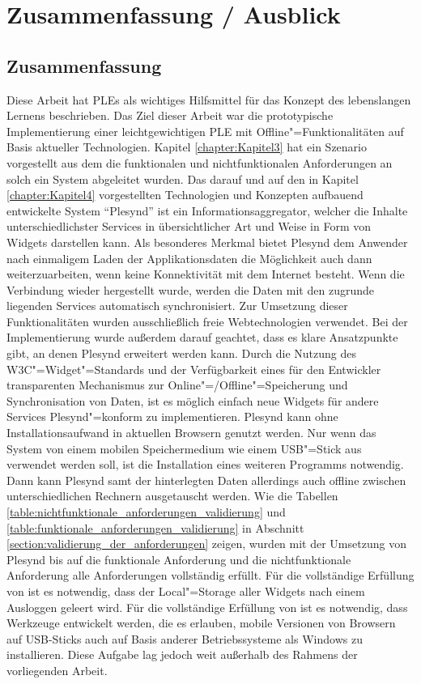 \chapter{Zusammenfassung / Ausblick}\label{chapter:Kapitel7}

\section{Zusammenfassung}
Diese Arbeit hat \acp{PLE} als wichtiges Hilfsmittel für das Konzept des lebenslangen Lernens beschrieben. Das Ziel dieser Arbeit war die prototypische Implementierung einer leichtgewichtigen \ac{PLE} mit Offline"=Funktionalitäten auf Basis aktueller Technologien. Kapitel \ref{chapter:Kapitel3} hat ein Szenario vorgestellt aus dem die funktionalen und nichtfunktionalen Anforderungen an solch ein System abgeleitet wurden. Das darauf und auf den in Kapitel \ref{chapter:Kapitel4} vorgestellten Technologien und Konzepten aufbauend entwickelte System "`Plesynd"' ist ein Informationsaggregator, welcher die Inhalte unterschiedlichster Services in übersichtlicher Art und Weise in Form von Widgets darstellen kann. Als besonderes Merkmal bietet Plesynd dem Anwender nach einmaligem Laden der Applikationsdaten die Möglichkeit auch dann weiterzuarbeiten, wenn keine Konnektivität mit dem Internet besteht. Wenn die Verbindung wieder hergestellt wurde, werden die Daten mit den zugrunde liegenden Services automatisch synchronisiert. Zur Umsetzung dieser Funktionalitäten wurden ausschließlich freie Webtechnologien verwendet. Bei der Implementierung wurde außerdem darauf geachtet, dass es klare Ansatzpunkte gibt, an denen Plesynd erweitert werden kann. Durch die Nutzung des \ac{W3C}"=Widget"=Standards und der Verfügbarkeit eines für den Entwickler transparenten Mechanismus zur Online"=/Offline"=Speicherung und Synchronisation von Daten, ist es möglich einfach neue Widgets für andere Services Plesynd"=konform zu implementieren. Plesynd kann ohne Installationsaufwand in aktuellen Browsern genutzt werden. Nur wenn das System von einem mobilen Speichermedium wie einem USB"=Stick aus verwendet werden soll, ist die Installation eines weiteren Programms notwendig. Dann kann Plesynd samt der hinterlegten Daten allerdings auch offline zwischen unterschiedlichen Rechnern ausgetauscht werden.  Wie die Tabellen \ref{table:nichtfunktionale_anforderungen_validierung} und \ref{table:funktionale_anforderungen_validierung} in Abschnitt \ref{section:validierung_der_anforderungen} zeigen, wurden mit der Umsetzung von Plesynd bis auf die funktionale Anforderung  und die nichtfunktionale Anforderung  alle Anforderungen vollständig erfüllt. Für die vollständige Erfüllung von  ist es notwendig, dass der Local"=Storage aller Widgets nach einem Ausloggen geleert wird. Für die vollständige Erfüllung von  ist es notwendig, dass Werkzeuge entwickelt werden, die es erlauben, mobile Versionen von Browsern auf USB-Sticks auch auf Basis anderer Betriebssysteme als Windows zu installieren. Diese Aufgabe lag jedoch weit außerhalb des Rahmens der vorliegenden Arbeit.

